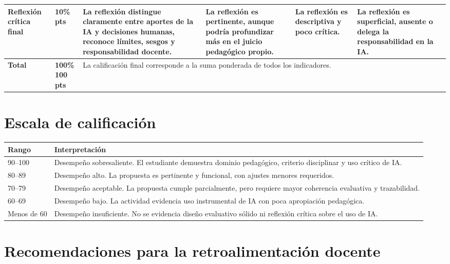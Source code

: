 \documentclass[12pt,letterpaper]{article}
\begin{document}
\begin{landscape}
\begin{longtable}{p{3.1cm} p{2cm} p{3.1cm} p{3.1cm} p{3.1cm} p{3.1cm}}
    \addlinespace

    Reflexión crítica final
    & 10\% \newline 10 pts
    & La reflexión distingue claramente entre aportes de la IA y
    decisiones humanas, reconoce límites, sesgos y responsabilidad docente.
    & La reflexión es pertinente, aunque podría profundizar más en el
    juicio pedagógico propio.
    & La reflexión es descriptiva y poco crítica.
    & La reflexión es superficial, ausente o delega la responsabilidad
    en la IA. \\

    \midrule
    \textbf{Total}
    & \textbf{100\% \newline 100 pts}
    & \multicolumn{4}{p{12.4cm}}{La calificación final corresponde a la
    suma ponderada de todos los indicadores.} \\

    \bottomrule
  \end{longtable}
\end{landscape}
\clearpage
\normalsize

\section{Escala de calificación}

\begin{longtable}{p{4cm} p{10cm}}
  \toprule
  \textbf{Rango} & \textbf{Interpretación} \\
  \midrule
  90--100 & Desempeño sobresaliente. El estudiante demuestra dominio
  pedagógico, criterio disciplinar y uso crítico de IA. \\
  80--89 & Desempeño alto. La propuesta es pertinente y funcional,
  con ajustes menores requeridos. \\
  70--79 & Desempeño aceptable. La propuesta cumple parcialmente,
  pero requiere mayor coherencia evaluativa y trazabilidad. \\
  60--69 & Desempeño bajo. La actividad evidencia uso instrumental de
  IA con poca apropiación pedagógica. \\
  Menos de 60 & Desempeño insuficiente. No se evidencia diseño
  evaluativo sólido ni reflexión crítica sobre el uso de IA. \\
  \bottomrule
\end{longtable}

\section{Recomendaciones para la retroalimentación docente}
\end{document}
